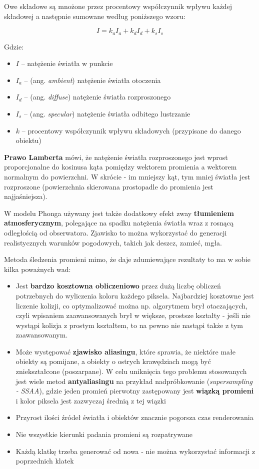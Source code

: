 Owe składowe są mnożone przez procentowy współczynnik wpływu każdej składowej a następnie sumowane według poniższego wzoru:

\begin{equation}
I = k_{a}I_{a} + k_{d}I_{d} + k_{s}I_{s}
\end{equation}

Gdzie:
\begin{itemize}
	\item $I$ – natężenie światła w punkcie
	\item $I_{a}$ – (ang. \textit{ambient}) natężenie światła otoczenia
    \item $I_{d}$ – (ang. \textit{diffuse}) natężenie światła rozproszonego
    \item $I_{s}$ – (ang. \textit{specular}) natężenie światła odbitego lustrzanie
	\item $k$ – procentowy współczynnik wpływu składowych (przypisane do danego obiektu)
\end{itemize}

\textbf{Prawo Lamberta} mówi, że natężenie światła rozproszonego jest wprost proporcjonalne do kosinusa kąta pomiędzy wektorem promienia a wektorem normalnym do powierzchni. W skrócie - im mniejszy kąt, tym mniej światła jest rozproszone (powierzchnia skierowana prostopadle do promienia jest najjaśniejsza).

W modelu Phonga używany jest także dodatkowy efekt zway \textbf{tłumieniem atmosferycznym}, polegające na spadku natężenia światła wraz z rosnącą odległością od obserwatora. Zjawisko to można wykorzystać do generacji realistycznych warunków pogodowych, takich jak deszcz, zamieć, mgła.

Metoda śledzenia promieni mimo, że daje zdumiewające rezultaty to ma w sobie kilka poważnych wad:
\begin{itemize}
	\item Jest \textbf{bardzo kosztowna obliczeniowo} przez dużą liczbę obliczeń potrzebnych do wyliczenia koloru każdego piksela. Najbardziej kosztowne jest liczenie kolizji, co optymalizować można np. algorytmem brył otaczających, czyli wpisaniem zaawansowanych brył w większe, prostsze kształty - jeśli nie wystąpi kolizja z prostym kształtem, to na pewno nie nastąpi także z tym zaawansowanym.
    \item Może występować \textbf{zjawisko aliasingu}, które sprawia, że niektóre małe obiekty są pomijane, a obiekty o ostrych krawędziach mogą być zniekształcone (poszarpane). W celu uniknięcia tego problemu stosowanych jest wiele metod \textbf{antyaliasingu} na przykład nadpróbkowanie (\textit{supersampling - SSAA}), gdzie jeden promień pierwotny zastępowany jest \textbf{wiązką promieni} i kolor piksela jest zazwyczaj średnią z tej wiązki
    \item Przyrost ilości źródeł światła i obiektów znacznie pogorsza czas renderowania
    \item Nie wszystkie kierunki padania promieni są rozpatrywane
    \item Każdą klatkę trzeba generować od nowa - nie można wykorzystać informacji z poprzednich klatek
\end{itemize}


